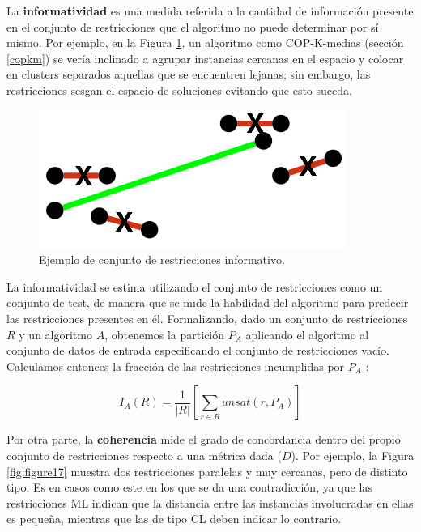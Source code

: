 La \textbf{informatividad} es una medida referida a la cantidad de información presente en el conjunto de restricciones que el algoritmo no puede determinar por sí mismo. Por ejemplo, en la Figura \ref{fig:figure16}, un algoritmo como COP-K-medias (sección \ref{copkm}) se vería inclinado a agrupar instancias cercanas en el espacio y colocar en clusters separados aquellas que se encuentren lejanas; sin embargo, las restricciones sesgan el espacio de soluciones evitando que esto suceda. 

\begin{figure}[!h]
	\centering
	\includegraphics[scale=0.4]{imagenes/c3/Inform/Inform} 
	\caption[Ejemplo de conjunto de restricciones informativo.]{Ejemplo de conjunto de restricciones informativo. \cite{Survey:2007}}\label{fig:figure16}
\end{figure}


La informatividad se estima utilizando el conjunto de restricciones como un conjunto de test, de manera que se mide la habilidad del algoritmo para predecir las restricciones presentes en él. Formalizando, dado un conjunto de restricciones $R$ y un algoritmo $A$, obtenemos la partición $P_A$ aplicando el algoritmo al conjunto de datos de entrada especificando el conjunto de restricciones vacío. Calculamos entonces la fracción de las restricciones incumplidas por $P_A$ \cite{Survey:2007}:

\begin{equation}
I_A(R) = \frac{1}{|R|}\left[ \sum_{r \in R} unsat(r, P_A) \right] 
\end{equation}

\clearpage

Por otra parte, la \textbf{coherencia} mide el grado de concordancia dentro del propio conjunto de restricciones respecto a una métrica dada ($D$). Por ejemplo, la Figura \ref{fig:figure17} muestra dos restricciones paralelas y muy cercanas, pero de distinto tipo. Es en casos como este en los que se da una contradicción, ya que las restricciones \acf{ML} indican que la distancia entre las instancias involucradas en ellas es pequeña, mientras que las de tipo \acf{CL} deben indicar lo contrario.

